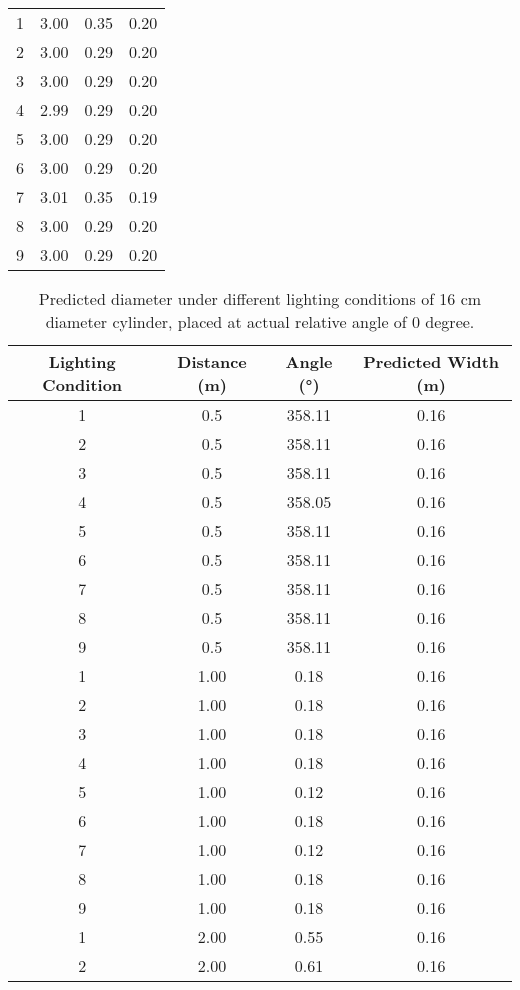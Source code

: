 \documentclass{report}
\begin{document}
\begin{table}[t]
\begin{tabular}{cccc}
    \cmidrule(lr){1-4}
    1 & 3.00 & 0.35 & 0.20 \\
    2 & 3.00 & 0.29 & 0.20 \\
    3 & 3.00 & 0.29 & 0.20 \\
    4 & 2.99 & 0.29 & 0.20 \\
    5 & 3.00 & 0.29 & 0.20 \\
    6 & 3.00 & 0.29 & 0.20 \\
    7 & 3.01 & 0.35 & 0.19 \\
    8 & 3.00 & 0.29 & 0.20 \\
    9 & 3.00 & 0.29 & 0.20 \\
    \bottomrule
    \end{tabular}
\end{table}

\begin{table}[htbp]
\centering
\caption{Predicted diameter under different lighting conditions of 16 cm diameter cylinder, placed at actual relative angle of 0 degree.}
\label{tab:16cm}
\begin{tabular}{cccc}
\toprule
\textbf{Lighting Condition} & \textbf{Distance (m)} & \textbf{Angle (°)} & \textbf{Predicted Width (m)} \\
\midrule
1 & 0.5 & 358.11 & 0.16 \\
2 & 0.5 & 358.11 & 0.16 \\
3 & 0.5 & 358.11 & 0.16 \\
4 & 0.5 & 358.05 & 0.16 \\
5 & 0.5 & 358.11 & 0.16 \\
6 & 0.5 & 358.11 & 0.16 \\
7 & 0.5 & 358.11 & 0.16 \\
8 & 0.5 & 358.11 & 0.16 \\
9 & 0.5 & 358.11 & 0.16 \\
\cmidrule(lr){1-4}
1 & 1.00 & 0.18 & 0.16 \\
2 & 1.00 & 0.18 & 0.16 \\
3 & 1.00 & 0.18 & 0.16 \\
4 & 1.00 & 0.18 & 0.16 \\
5 & 1.00 & 0.12 & 0.16 \\
6 & 1.00 & 0.18 & 0.16 \\
7 & 1.00 & 0.12 & 0.16 \\
8 & 1.00 & 0.18 & 0.16 \\
9 & 1.00 & 0.18 & 0.16 \\
\cmidrule(lr){1-4}
1 & 2.00 & 0.55 & 0.16 \\
2 & 2.00 & 0.61 & 0.16 \\

\end{tabular}
\end{table}
\end{document}
